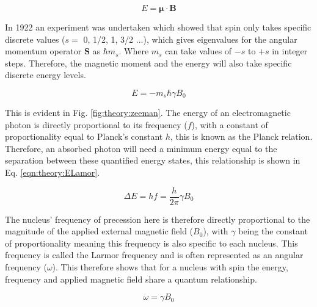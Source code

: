\begin{equation}
    E = \mathbf{\mu} \cdot \mathbf{B}
\end{equation}

In 1922 an experiment was undertaken \cite{Gerlach1922DerMagnetfeld} which showed that spin only takes specific discrete values ($s =$ 0, 1/2, 1, 3/2 ...), which gives eigenvalues for the angular momentum operator $\mathbf{S}$ as $\hbar m_s$. Where $m_s$ can take values of $-s$ to $+s$ in integer steps. Therefore, the magnetic moment and the energy will also take specific discrete energy levels.

\begin{equation}
    E = -m_s\hbar \gamma B_0
    \label{eqn:theory:ESpin}
\end{equation}

This is evident in Fig. \ref{fig:theory:zeeman}. The energy of an electromagnetic photon is directly proportional to its frequency ($f$), with a constant of proportionality equal to Planck's constant $h$, this is known as the Planck relation. Therefore, an absorbed photon will need a minimum energy equal to the separation between these quantified energy states, this relationship is shown in Eq. \ref{eqn:theory:ELamor}.

\begin{equation}
    \Delta E = hf = \frac{h}{2\pi}\gamma B_0
    \label{eqn:theory:ELamor}
\end{equation}  

The nucleus' frequency of precession here is therefore directly proportional to the magnitude of the applied external magnetic field ($B_0$), with $\gamma$ being the constant of proportionality meaning this frequency is also specific to each nucleus. This frequency is called the Larmor frequency \cite{Larmor1897LXIII.Ions} and is often represented as an angular frequency ($\omega$). This therefore shows that for a nucleus with spin the energy, frequency and applied magnetic field share a quantum relationship. 

\begin{equation}
    \omega = \gamma B_0
    \label{eqn:theory:Lamor}
\end{equation}

